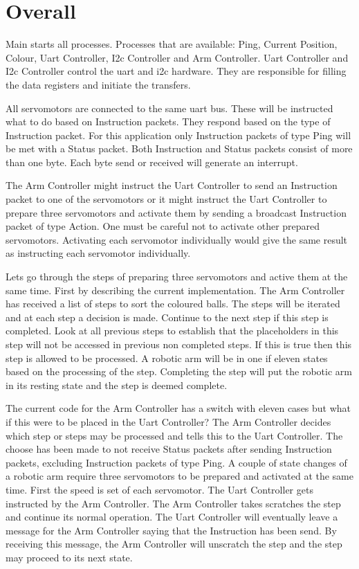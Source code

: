 \documentclass[12pt]{article}
\begin{document}
\section{Overall}
Main starts all processes.
Processes that are available: Ping, Current Position, Colour, Uart Controller, I2c Controller and Arm Controller.
Uart Controller and I2c Controller control the uart and i2c hardware.
They are responsible for filling the data registers and initiate the transfers.

All servomotors are connected to the same uart bus.
These will be instructed what to do based on Instruction packets.
They respond based on the type of Instruction packet.
For this application only Instruction packets of type Ping will be met with a Status packet.
Both Instruction and Status packets consist of more than one byte.
Each byte send or received will generate an interrupt.

The Arm Controller might instruct the Uart Controller to send an Instruction packet to one of the servomotors or it might instruct the Uart Controller to prepare three servomotors and activate them by sending a broadcast Instruction packet of type Action.
One must be careful not to activate other prepared servomotors.
Activating each servomotor individually would give the same result as instructing each servomotor individually.

Lets go through the steps of preparing three servomotors and active them at the same time.
First by describing the current implementation.
The Arm Controller has received a list of steps to sort the coloured balls.
The steps will be iterated and at each step a decision is made.
Continue to the next step if this step is completed.
Look at all previous steps to establish that the placeholders in this step will not be accessed in previous non completed steps.
If this is true then this step is allowed to be processed.
A robotic arm will be in one if eleven states based on the processing of the step.
Completing the step will put the robotic arm in its resting state and the step is deemed complete.

The current code for the Arm Controller has a switch with eleven cases but what if this were to be placed in the Uart Controller?
The Arm Controller decides which step or steps may be processed and tells this to the Uart Controller.
The choose has been made to not receive Status packets after sending Instruction packets, excluding Instruction packets of type Ping.
A couple of state changes of a robotic arm require three servomotors to be prepared and activated at the same time.
First the speed is set of each servomotor.
The Uart Controller gets instructed by the Arm Controller.
The Arm Controller takes scratches the step and continue its normal operation.
The Uart Controller will eventually leave a message for the Arm Controller saying that the Instruction has been send.
By receiving this message, the Arm Controller will unscratch the step and the step may proceed to its next state.
\end{document}
